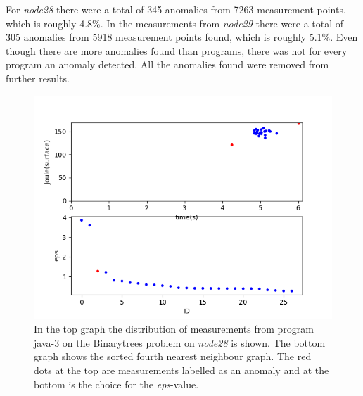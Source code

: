For \textit{node28} there were a total of 345 anomalies from 7263 measurement points, which is roughly 4.8\%. In the measurements from \textit{node29} there were a total of 305 anomalies from 5918 measurement points found, which is roughly 5.1\%. Even though there are more anomalies found than programs, there was not for every program an anomaly detected. All the anomalies found were removed from further results.

\begin{figure}[h]
    \centering
    \includegraphics[width=.6\textwidth]{graphs/port3-bdscan-java-3-problem0-eps1-27.png}
    \caption{In the top graph the distribution of measurements from program java-3 on the Binarytrees problem on \textit{node28} is shown. The bottom graph shows the sorted fourth nearest neighbour graph. The red dots at the top are measurements labelled as an anomaly and at the bottom is the choice for the \textit{eps}-value.}
    \label{fig:anomalies}
\end{figure}


